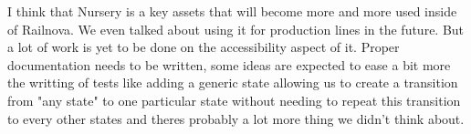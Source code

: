 \documentclass[12pt]{article}
\begin{document}
I think that Nursery is a key assets that will become more and more used inside of Railnova. We even talked about using it for production lines in the future. But a lot of work is yet to be done on the accessibility aspect of it. Proper documentation needs to be written, some ideas are expected to ease a bit more the writting of tests like adding a generic state allowing us to create a transition from "any state" to one particular state without needing to repeat this transition to every other states and theres probably a lot more thing we didn't think about.


\appendix

\end{document}
